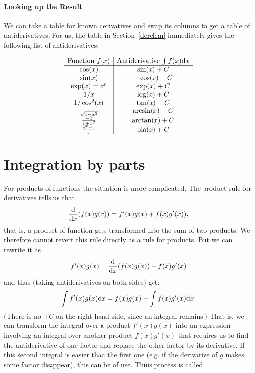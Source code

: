 \paragraph{Looking up the Result}

We can take a table for known derivatives and swap its columns to get a
table of antiderivatives.
For us, the table in Section~\ref{derelem} immediately gives the following
list of antiderivatives:

\[
\begin{array}{c|c}
\mbox{Function $f(x)$}&\mbox{Antiderivative $\int f(x){\mbox{d}}x$}\\
\hline
\cos(x)&\sin(x)+C\\
\sin(x)&-\cos(x)+C\\
\exp(x)=e^x&\exp(x)+C\\
1/x&\log(x)+C\\
1/\cos^2(x)&\tan(x)+C\\
\frac{1}{\sqrt{1-x^2}}&
\arcsin(x)+C\\
\frac{-1}{1+x^2}&
\arctan(x)+C\\
\frac{e^x-1}{x}&
\mbox{bla}(x)+C\\
\end{array}
\]

\section{Integration by parts}

For products of functions the situation is more complicated. The product
rule for derivatives tells us that 
\[
\frac{\mbox{d}}{\mbox{d}x} (f(x)g(x))=f'(x)g(x)+f(x)g'(x)),
\]
that is, a product of function gets transformed into the sum of two
products. We therefore cannot revert this rule directly as a rule for
products. But we can rewrite it as
\[
f'(x)g(x)= \frac{\mbox{d}}{\mbox{d}x} (f(x)g(x))-f(x)g'(x)
\]
and thus (taking antiderivatives on both sides) get:
\[
\int f'(x)g(x){\mbox{d}}x=f(x)g(x)-\int f(x)g'(x){\mbox{d}}x.
\]
(There is no $+C$ on the right hand side, since an integral remains.)
That is, we can transform the integral over a product $f'(x)g(x)$ into an
expression involving an integral over another product $f(x)g'(x)$ that
requires us to find the antiderivative of one factor and replace the other
factor by its derivative. If this second integral is easier than the first
one (e.g. if the derivative of $g$ makes some factor disappear), this can be of
use. Thuis process is called 

